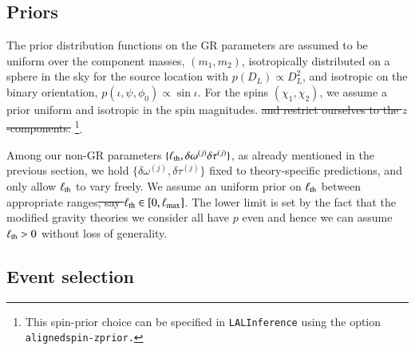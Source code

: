 \documentclass[twocolumn,
               prd,
               aps,
               superscriptaddress,
               tightenlines,
               nofootinbib,
               eqsecnum,
               amsfonts,
               amsmath,
               longbibliography]{revtex4-1}
\begin{document}
\subsection{Priors}

The prior distribution functions on the GR parameters are assumed to be
uniform over the component masses, $(m_1, m_2)$, isotropically distributed on a
sphere in the sky for the source location with $p(D_L) \propto D_L^2$, and isotropic
on the binary orientation, $p(\iota, \psi, \phi_0) \propto \sin\iota$. For the spins
$(\chi_1, \chi_2)$, we assume a prior uniform and isotropic in the spin magnitudes.\sout{ and restrict ourselves to the $z$-components.} \footnote{This spin-prior choice can be specified in \texttt{LALInference} using the option \texttt{alignedspin-zprior.}}.
%

Among our non-GR parameters $\{\ell_{\rm th}, \delta \omega^{(j)}\delta \tau^{(j)}\}$,
as already mentioned in the previous section, we hold $\{\delta \omega^{(j)},\delta \tau^{(j)}\}$
fixed to theory-specific predictions, and only allow $\ell_{\rm th}$ to vary freely.
%
We assume an uniform prior on $\ell_{\rm th}$ between appropriate ranges\sout{,
say $\ell_{\rm th} \in [0, \ell_{\rm max}]$}.
%
The lower limit is set by the fact that the modified gravity theories we consider
all have $p$ even and hence we can assume $\ell_{\rm th} > 0$ without loss of
generality.
%


\subsection{Event selection}
\end{document}
